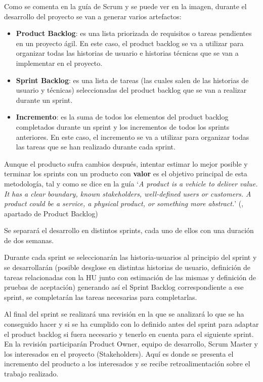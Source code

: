 Como se comenta en la guía de Scrum y se puede ver en la imagen, durante el desarrollo del proyecto se van a generar varios artefactos:
\begin{itemize}
    \item \textbf{Product Backlog}: es una lista priorizada de requisitos o tareas pendientes en un proyecto ágil. En este caso, el product backlog se va a utilizar para organizar todas las historias de usuario e historias técnicas que se van a implementar en el proyecto.
    \item \textbf{Sprint Backlog}: es una lista de tareas (las cuales salen de las historias de usuario y técnicas) seleccionadas del product backlog que se van a realizar durante un sprint.
    \item \textbf{Incremento}: es la suma de todos los elementos del product backlog completados durante un sprint y los incrementos de todos los sprints anteriores. En este caso, el incremento se va a utilizar para organizar todas las tareas que se han realizado durante cada sprint.
\end{itemize}
Aunque el producto sufra cambios después, intentar estimar lo mejor posible y terminar los sprints con un producto con \textbf{valor} es el objetivo principal de esta metodología, tal y como se dice en la guía `\textit{A product is a vehicle to deliver value. It has a clear boundary, known stakeholders, well-defined users or customers. A product could be a service, a physical product, or something more abstract.}' (\cite{scrum-guide}, apartado de Product Backlog)

Se separará el desarrollo en distintos sprints, cada uno de ellos con una duración de dos semanas.

Durante cada sprint se seleccionarán las \glspl{historia-usuario} al principio del sprint y se desarrollarán (posible desglose en distintas historias de usuario, definición de tareas relacionadas con la HU junto con estimación de las mismas y definición de pruebas de aceptación) generando así el Sprint Backlog correspondiente a ese sprint, se completarán las tareas necesarias para completarlas.

Al final del sprint se realizará una revisión en la que se analizará lo que se ha conseguido hacer y si se ha cumplido con lo definido antes del sprint para adaptar el product backlog si fuera necesario y tenerlo en cuenta para el siguiente sprint. En la revisión participarán Product Owner, equipo de desarrollo, Scrum Master y los interesados en el proyecto (Stakeholders). Aquí es donde se presenta el incremento del producto a los interesados y se recibe retroalimentación sobre el trabajo realizado.

